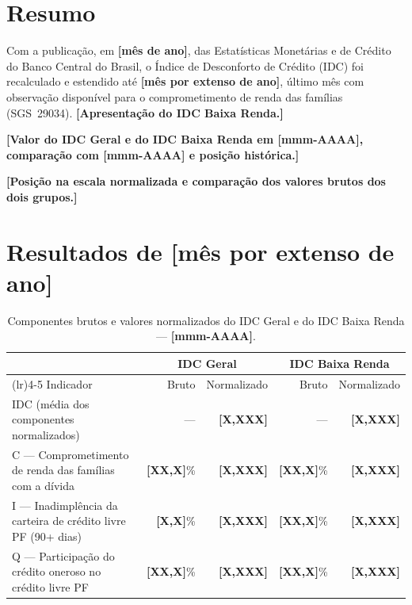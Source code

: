 \documentclass[11pt,a4paper]{article}
\newcommand{\placeholder}[1]{\textbf{[#1]}}
\newcommand{\mesreferencia}{\placeholder{mês por extenso de ano}}   %
\newcommand{\mesref}{\placeholder{mmm-AAAA}}                        %
\newcommand{\mesanterior}{\placeholder{mmm-AAAA}}                   %
\newcommand{\mespublicacao}{\placeholder{mês de ano}}               %
\begin{document}
\section{Resumo}

Com a publicação, em \mespublicacao, das Estatísticas Monetárias e de Crédito do
Banco Central do Brasil, o Índice de Desconforto de Crédito (IDC) foi recalculado e
estendido até \mesreferencia, último mês com observação disponível para o
comprometimento de renda das famílias (SGS~29034).
\placeholder{Apresentação do IDC Baixa Renda.}

\placeholder{Valor do IDC Geral e do IDC Baixa Renda em \mesref, comparação com \mesanterior{} e posição histórica.}

\placeholder{Posição na escala normalizada e comparação dos valores brutos dos dois grupos.}

\section{Resultados de \mesreferencia}

\begin{table}[htbp]
  \centering
  \caption{Componentes brutos e valores normalizados do IDC Geral e do IDC Baixa Renda --- \mesref.}
  \label{tab:componentes}
  \begin{tabular}{>{\raggedright\arraybackslash}p{6.0cm}rrrr}
    \toprule
    & \multicolumn{2}{c}{IDC Geral} & \multicolumn{2}{c}{IDC Baixa Renda} \\
    \cmidrule(lr){2-3}\cmidrule(lr){4-5}
    Indicador & Bruto & Normalizado & Bruto & Normalizado \\
    \midrule
    IDC (média dos componentes normalizados) & --- & \textbf{\placeholder{X,XXX}} & --- & \textbf{\placeholder{X,XXX}} \\
    C --- Comprometimento de renda das famílias com a dívida & \placeholder{XX,X}\% & \placeholder{X,XXX} & \placeholder{XX,X}\% & \placeholder{X,XXX} \\
    I --- Inadimplência da carteira de crédito livre PF (90+ dias) & \placeholder{X,X}\% & \placeholder{X,XXX} & \placeholder{XX,X}\% & \placeholder{X,XXX} \\
    Q --- Participação do crédito oneroso no crédito livre PF & \placeholder{XX,X}\% & \placeholder{X,XXX} & \placeholder{XX,X}\% & \placeholder{X,XXX} \\
    \bottomrule
  \end{tabular}
\end{table}
\end{document}
